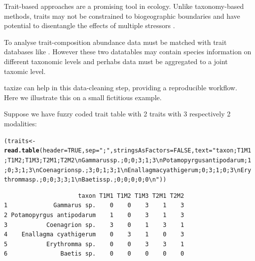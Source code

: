 \documentclass[letterpaper,superscriptaddress,showkeys,longbibliography,10pt]{revtex4-1}\usepackage{graphicx, color}
\makeatletter
\newcommand{\hlfunctioncall}[1]{\textcolor[rgb]{0.501960784313725,0,0.329411764705882}{\textbf{#1}}}%
\newcommand{\hlstring}[1]{\textcolor[rgb]{0.6,0.6,1}{#1}}%
\newenvironment{kframe}{%
 \def\at@end@of@kframe{}%
 \ifinner\ifhmode%
  \def\at@end@of@kframe{\end{minipage}}%
  \begin{minipage}{\columnwidth}%
 \fi\fi%
 \def\FrameCommand##1{\hskip\@totalleftmargin \hskip-\fboxsep
 \colorbox{shadecolor}{##1}\hskip-\fboxsep
     \hskip-\linewidth \hskip-\@totalleftmargin \hskip\columnwidth}%
 \MakeFramed {\advance\hsize-\width
   \@totalleftmargin\z@ \linewidth\hsize
   \@setminipage}}%
 {\par\unskip\endMakeFramed%
 \at@end@of@kframe}
\newenvironment{knitrout}{}{} %
\makeatother
\begin{document}
\begin{appendices}
Trait-based approaches are a promising tool in ecology. Unlike taxonomy-based methods, traits may not be constrained to biogeographic boundaries \citep{baird_toward_2011} and have potential to disentangle the effects of multiple stressors \citep{statzner_can_2010}. 

To analyse trait-composition abundance data must be matched with trait databases like \citet{usseglio-polatera_biological_2000}. However these two datatables may contain species information on different taxonomic levels and perhabs data must be aggregated to a joint taxomic level.

taxize can help in this data-cleaning step, providing a reproducible workflow. Here we illustrate this on a small fictitious example.

Suppose we have fuzzy coded trait table with 2 traits with 3 respectively 2 modalities:
\begin{knitrout}
\color{fgcolor}\begin{kframe}
\begin{alltt}
(traits <- \hlfunctioncall{read.table}(header = TRUE, sep = \hlstring{";"}, stringsAsFactors = FALSE, text = \hlstring{"taxon;T1M1;T1M2;T1M3;T2M1;T2M2\textbackslash{}nGammarus sp.;0;0;3;1;3\textbackslash{}nPotamopyrgus antipodarum;1;0;3;1;3\textbackslash{}nCoenagrion sp.;3;0;1;3;1\textbackslash{}nEnallagma cyathigerum;0;3;1;0;3\textbackslash{}nErythromma sp.;0;0;3;3;1\textbackslash{}nBaetis sp.;0;0;0;0;0\textbackslash{}n"}))
\end{alltt}
\begin{verbatim}
                     taxon T1M1 T1M2 T1M3 T2M1 T2M2
1             Gammarus sp.    0    0    3    1    3
2 Potamopyrgus antipodarum    1    0    3    1    3
3           Coenagrion sp.    3    0    1    3    1
4    Enallagma cyathigerum    0    3    1    0    3
5           Erythromma sp.    0    0    3    3    1
6               Baetis sp.    0    0    0    0    0
\end{verbatim}
\end{kframe}
\end{knitrout}



\end{appendices}
\end{document}
